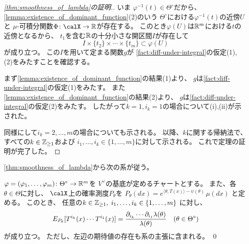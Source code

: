 \documentclass[report]{jlreq}
\begin{document}
\begin{proof}[\cref{thm:smoothness_of_lambda}の証明.]
    いま
    $\varphi^{-1}(t) \in \Theta^\circ$だから、
    \cref{lemma:existence_of_dominant_function}(2)のいう
    $\Theta^\circ$における$\varphi^{-1}(t)$の近傍$U$と
    $\mu$-可積分関数$\Phi \colon \calX \to \R$が存在する。
    このとき$\varphi(U)$は$\mathbb{R}^m$における$t$の近傍となるから、
    $t_1$を含む$\mathbb{R}$の十分小さな開区間$I$が存在して
    \begin{equation}
        I \times \{ t_2 \} \times \cdots \times \{ t_m \}
            \subset \varphi(U)
    \end{equation}
    が成り立つ。
    この$I$を用いて定まる関数$g$が
    \cref{fact:diff-under-integral}の仮定(1), (2)をみたすことを確認する。

    まず\cref{lemma:existence_of_dominant_function}の結果(1)より、
    $g$は\cref{fact:diff-under-integral}の仮定(1)をみたす。
    また\cref{lemma:existence_of_dominant_function}の結果(2)より、
    $g$は\cref{fact:diff-under-integral}の仮定(2)をみたす。
    したがって$k = 1, i_k = 1$の場合について(i),(ii)が示された。

    同様にして$i_k = 2, \dots, m$の場合についても示される。
    以降、$k$に関する帰納法で、すべての$k \in \mathbb{Z}_{\ge 1}$および
    $i_1, \dots, i_k \in \{ 1, \dots, m \}$に対して示される。
    これで定理の証明が完了した。
\end{proof}

\cref{thm:smoothness_of_lambda}から次の系が従う。

\begin{corollary}
    $\varphi = (\varphi_1, \dots, \varphi_m) \colon \Theta^\circ \to \mathbb{R}^m$を
    $V^\vee$の基底が定めるチャートとする。
    また、各$\theta \in \Theta$に対し、
    $\calX$上の確率測度$P_\theta$を
    $P_\theta(dx)
        = e^{\langle \theta, T(x) \rangle - \psi(\theta)} \, \mu(dx)$
    と定める。
    このとき、
    任意の$k \in \mathbb{Z}_{\ge 1}, \;
        i_1, \dots, i_k \in \{ 1, \dots, m \}$
    に対し、
    \begin{equation}
        E_{P_\theta}[T^{i_k}(x) \cdots T^{i_1}(x)]
            = \frac{
                \partial_{i_k} \cdots \partial_{i_1} \lambda(\theta)
            }{
                \lambda(\theta)
            }
            \quad
            (\theta \in \Theta^\circ)
    \end{equation}
    が成り立つ。
    ただし、左辺の期待値の存在も系の主張に含まれる。
    \qed
\end{corollary}

%
\end{document}
